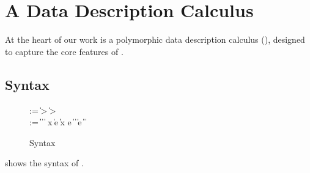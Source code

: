 \section{A Data Description Calculus}
\label{sec:ddc}

At the heart of our work is a polymorphic data description calculus (\ddc{}),
designed to capture the core features of \padsml.

\subsection{\ddc{} Syntax}
\begin{figure}
{\small
\begin{bnf}
   \meta{\gk} \::= \kty \| \ity \-> \gk 
                               \| \kty \-> \gk \\
   \meta{\ty} \::= 
    \ptrue\| \pfalse \|  \| 
    \plam{\var}{\ity}{\ty} \|  \nlalt
    \psig x \ty \ty \| \psum \ty e \ty \| \pand \ty \ty \|
    \pset x \ty e \| \pseq \ty {} \nlalt
    \ptyvar       \| \pmu{\ptyvar}{\gk}{\ty} \| \pcompute e \ity \| 
     \pabsorb \ty \| \pscan{\ty} 
    \nlalt \ptylam{\ptyvar}{\kty}{\ty} \| \ptyapp{\ty}{\ty}
\end{bnf}
}
\caption{\ddc{} Syntax}
\label{fig:ddc-syntax}
\end{figure}
 shows the syntax of \ddc{}. 


